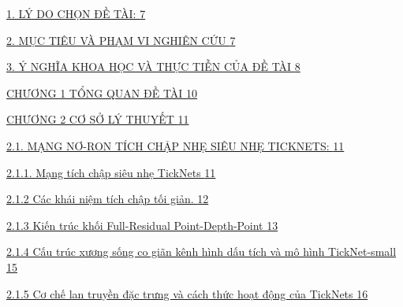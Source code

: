 \documentclass[
]{article}
\begin{document}
\protect\hyperlink{luxfd-do-chux1ecdn-ux111ux1ec1-tuxe0i}{1. LÝ DO CHỌN
ĐỀ TÀI: \protect\hyperlink{luxfd-do-chux1ecdn-ux111ux1ec1-tuxe0i}{7}}

\protect\hyperlink{mux1ee5c-tiuxeau-vuxe0-phux1ea1m-vi-nghiuxean-cux1ee9u}{2.
MỤC TIÊU VÀ PHẠM VI NGHIÊN CỨU
\protect\hyperlink{mux1ee5c-tiuxeau-vuxe0-phux1ea1m-vi-nghiuxean-cux1ee9u}{7}}

\protect\hyperlink{uxfd-nghux129a-khoa-hux1ecdc-vuxe0-thux1ef1c-tiux1ec5n-cux1ee7a-ux111ux1ec1-tuxe0i}{3.
Ý NGHĨA KHOA HỌC VÀ THỰC TIỄN CỦA ĐỀ TÀI
\protect\hyperlink{uxfd-nghux129a-khoa-hux1ecdc-vuxe0-thux1ef1c-tiux1ec5n-cux1ee7a-ux111ux1ec1-tuxe0i}{8}}

\protect\hyperlink{chux1b0ux1a1ng-1-tux1ed5ng-quan-ux111ux1ec1-tuxe0i}{CHƯƠNG
1 TỔNG QUAN ĐỀ TÀI
\protect\hyperlink{chux1b0ux1a1ng-1-tux1ed5ng-quan-ux111ux1ec1-tuxe0i}{10}}

\protect\hyperlink{chux1b0ux1a1ng-2-cux1a1-sux1edf-luxfd-thuyux1ebft}{CHƯƠNG
2 CƠ SỞ LÝ THUYẾT
\protect\hyperlink{chux1b0ux1a1ng-2-cux1a1-sux1edf-luxfd-thuyux1ebft}{11}}

\protect\hyperlink{mux1ea1ng-nux1a1-ron-tuxedch-chux1eadp-nhux1eb9-siuxeau-nhux1eb9-ticknets}{2.1.
MẠNG NƠ-RON TÍCH CHẬP NHẸ SIÊU NHẸ TICKNETS:
\protect\hyperlink{mux1ea1ng-nux1a1-ron-tuxedch-chux1eadp-nhux1eb9-siuxeau-nhux1eb9-ticknets}{11}}

\protect\hyperlink{mux1ea1ng-tuxedch-chux1eadp-siuxeau-nhux1eb9-ticknets}{2.1.1.
Mạng tích chập siêu nhẹ TickNets
\protect\hyperlink{mux1ea1ng-tuxedch-chux1eadp-siuxeau-nhux1eb9-ticknets}{11}}

\protect\hyperlink{cuxe1c-khuxe1i-niux1ec7m-tuxedch-chux1eadp-tux1ed1i-giux1ea3n.}{2.1.2
Các khái niệm tích chập tối giản.
\protect\hyperlink{cuxe1c-khuxe1i-niux1ec7m-tuxedch-chux1eadp-tux1ed1i-giux1ea3n.}{12}}

\protect\hyperlink{kiux1ebfn-truxfac-khux1ed1i-full-residual-point-depth-point}{2.1.3
Kiến trúc khối Full-Residual Point-Depth-Point
\protect\hyperlink{kiux1ebfn-truxfac-khux1ed1i-full-residual-point-depth-point}{13}}

\protect\hyperlink{cux1ea5u-truxfac-xux1b0ux1a1ng-sux1ed1ng-co-giuxe3n-kuxeanh-huxecnh-dux1ea5u-tuxedch-vuxe0-muxf4-huxecnh-ticknet-small}{2.1.4
Cấu trúc xương sống co giãn kênh hình dấu tích và mô hình TickNet-small
\protect\hyperlink{cux1ea5u-truxfac-xux1b0ux1a1ng-sux1ed1ng-co-giuxe3n-kuxeanh-huxecnh-dux1ea5u-tuxedch-vuxe0-muxf4-huxecnh-ticknet-small}{15}}

\protect\hyperlink{cux1a1-chux1ebf-lan-truyux1ec1n-ux111ux1eb7c-trux1b0ng-vuxe0-cuxe1ch-thux1ee9c-houx1ea1t-ux111ux1ed9ng-cux1ee7a-ticknets}{2.1.5
Cơ chế lan truyền đặc trưng và cách thức hoạt động của TickNets
\protect\hyperlink{cux1a1-chux1ebf-lan-truyux1ec1n-ux111ux1eb7c-trux1b0ng-vuxe0-cuxe1ch-thux1ee9c-houx1ea1t-ux111ux1ed9ng-cux1ee7a-ticknets}{16}}
\end{document}
